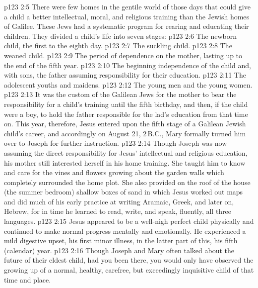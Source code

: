 \vs p123 2:5 There were few homes in the gentile world of those days that could give a child a better intellectual, moral, and religious training than the Jewish homes of Galilee. These Jews had a systematic program for rearing and educating their children. They divided a child’s life into seven stages:
\vs p123 2:6 \bibnobreakspace The newborn child, the first to the eighth day.
\vs p123 2:7 \bibnobreakspace The suckling child.
\vs p123 2:8 \bibnobreakspace The weaned child.
\vs p123 2:9 \bibnobreakspace The period of dependence on the mother, lasting up to the end of the fifth year.
\vs p123 2:10 \bibnobreakspace The beginning independence of the child and, with sons, the father assuming responsibility for their education.
\vs p123 2:11 \bibnobreakspace The adolescent youths and maidens.
\vs p123 2:12 \bibnobreakspace The young men and the young women.
\vs p123 2:13 \pc It was the custom of the Galilean Jews for the mother to bear the responsibility for a child’s training until the fifth birthday, and then, if the child were a boy, to hold the father responsible for the lad’s education from that time on. This year, therefore, Jesus entered upon the fifth stage of a Galilean Jewish child’s career, and accordingly on August 21, 2\,B.C., Mary formally turned him over to Joseph for further instruction.
\vs p123 2:14 Though Joseph was now assuming the direct responsibility for Jesus’ intellectual and religious education, his mother still interested herself in his home training. She taught him to know and care for the vines and flowers growing about the garden walls which completely surrounded the home plot. She also provided on the roof of the house (the summer bedroom) shallow boxes of sand in which Jesus worked out maps and did much of his early practice at writing Aramaic, Greek, and later on, Hebrew, for in time he learned to read, write, and speak, fluently, all three languages.
\vs p123 2:15 Jesus appeared to be a well\hyp{}nigh perfect child physically and continued to make normal progress mentally and emotionally. He experienced a mild digestive upset, his first minor illness, in the latter part of this, his fifth (calendar) year.
\vs p123 2:16 Though Joseph and Mary often talked about the future of their eldest child, had you been there, you would only have observed the growing up of a normal, healthy, carefree, but exceedingly inquisitive child of that time and place.
